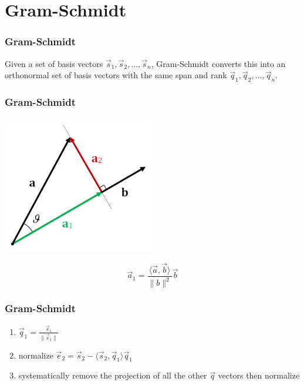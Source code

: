 \section{Gram-Schmidt}

\begin{frame}
    \frametitle{Gram-Schmidt}

    Given a set of basis vectors \(\vec{s}_1, \vec{s}_2, \ldots, \vec{s}_n\), Gram-Schmidt converts this into an orthonormal set of basis vectors with the same span and rank \(\vec{q}_1, \vec{q}_2, \ldots, \vec{q}_n\).
\end{frame}

\begin{frame}
    \frametitle{Gram-Schmidt}

    \begin{center}
        \includegraphics[width=0.5\textwidth]{images/projection.png}
    \end{center}

    \begin{equation}
        \vec{a}_1 = \frac{\langle \vec{a}, \vec{b} \rangle}{\|b\|^2} \vec{b}
    \end{equation}
\end{frame}

\begin{frame}
    \frametitle{Gram-Schmidt}

    \begin{enumerate}
        \item \(\vec{q}_1 = \frac{\vec{s}_1}{\|\vec{s}_1\|}\)
        \item normalize \(\vec{e}_2 = \vec{s}_2 - \langle \vec{s}_2, \vec{q}_1 \rangle \vec{q}_1\)
        \item systematically remove the projection of all the other \(\vec{q}\) vectors then normalize
    \end{enumerate}
\end{frame}
